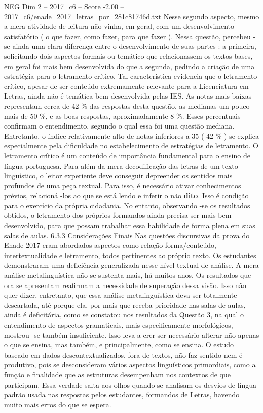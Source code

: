 \begin{textsample}{NEG Dim 2 – 2017\_c6 – Score -2.00 – 2017\_c6/enade\_2017\_letras\_por\_281c81746d.txt}
Nesse segundo aspecto, mesmo a mera atividade de leitura não vinha, em geral, com um desenvolvimento satisfatório ( o que fazer, como fazer, para que fazer ).
Nessa questão, percebeu -se ainda uma clara diferença entre o desenvolvimento de suas partes : a primeira, solicitando dois aspectos formais ou temático que relacionassem os textos-bases, em geral foi mais bem desenvolvida do que a segunda, pedindo a criação de uma estratégia para o letramento crítico.
Tal característica evidencia que o letramento crítico, apesar de ser conteúdo extremamente relevante para a Licenciatura em Letras, ainda não é temática bem desenvolvida pelas IES.
As notas mais baixas representam cerca de 42 \% das respostas desta questão, as medianas um pouco mais de 50 \%, e as boas respostas, aproximadamente 8 \%.
Esses percentuais confirmam o entendimento, segundo o qual essa foi uma questão mediana.
Entretanto, o índice relativamente alto de notas inferiores a 35 ( 42 \% ) se explica especialmente pela dificuldade no estabelecimento de estratégias de letramento.
O letramento crítico é um conteúdo de importância fundamental para o ensino de língua portuguesa.
Para além da mera decodificação das letras de um texto linguístico, o leitor experiente deve conseguir depreender os sentidos mais profundos de uma peça textual.
Para isso, é necessário ativar conhecimentos prévios, relacioná -los ao que se está lendo e inferir o não \textbf{dito}.
Isso é condição para o exercício da própria cidadania.
No entanto, observando -se os resultados obtidos, o letramento dos próprios formandos ainda precisa ser mais bem desenvolvido, para que possam trabalhar essa habilidade de forma plena em suas salas de aulas. 6.3.3 Considerações Finais Nas questões discursivas da prova do Enade 2017 eram abordados aspectos como relação forma/conteúdo, intertextualidade e letramento, todos pertinentes ao próprio texto.
Os estudantes demonstraram uma deficiência generalizada nesse nível textual de análise.
A mera análise metalinguística não se sustenta mais, há muitos anos.
Os resultados que ora se apresentam reafirmam a necessidade de superação dessa visão.
Isso não quer dizer, entretanto, que essa análise metalinguística deva ser totalmente descartada, até porque ela, por mais que receba prioridade nas salas de aulas, ainda é deficitária, como se constatou nos resultados da Questão 3, na qual o entendimento de aspectos gramaticais, mais especificamente morfológicos, mostrou -se também insuficiente.
Isso leva a crer ser necessário alterar não apenas o que se ensina, mas também, e principalmente, como se ensina.
O estudo baseado em dados descontextualizados, fora de textos, não faz sentido nem é produtivo, pois se desconsideram vários aspectos linguísticos primordiais, como a função e finalidade que as estruturas desempenham nos contextos de que participam.
Essa verdade salta aos olhos quando se analisam os desvios de língua padrão usada nas respostas pelos estudantes, formandos de Letras, havendo muito mais erros do que se espera.

\end{textsample}
